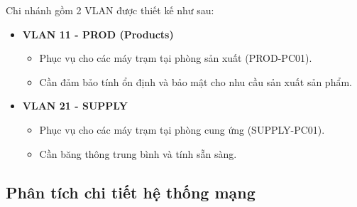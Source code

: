 \documentclass[13pt]{article}
\begin{document}
Chi nhánh gồm 2 VLAN được thiết kế như sau:
\begin{itemize}
    \item \textbf{VLAN 11 - PROD (Products)}
        \begin{itemize}
            \item Phục vụ cho các máy trạm tại phòng sản xuất (PROD-PC01).
            \item Cần đảm bảo tính ổn định và bảo mật cho nhu cầu sản xuất sản phẩm.
        \end{itemize}
    \item \textbf{VLAN 21 - SUPPLY}
        \begin{itemize}
            \item Phục vụ cho các máy trạm tại phòng cung ứng (SUPPLY-PC01).
            \item Cần băng thông trung bình và tính sẵn sàng.
        \end{itemize}
\end{itemize}
\subsection{Phân tích chi tiết hệ thống mạng}
\end{document}
